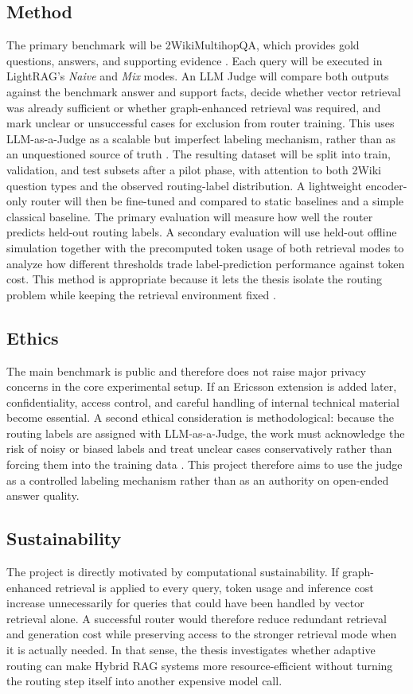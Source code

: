 \documentclass[11pt, a4paper]{article}
\begin{document}
\subsection{Method} The primary benchmark will be 2WikiMultihopQA, which provides gold questions, answers, and supporting evidence \cite{ho2020twowiki}. Each query will be executed in LightRAG's \emph{Naive} and \emph{Mix} modes. An LLM Judge will compare both outputs against the benchmark answer and support facts, decide whether vector retrieval was already sufficient or whether graph-enhanced retrieval was required, and mark unclear or unsuccessful cases for exclusion from router training. This uses LLM-as-a-Judge as a scalable but imperfect labeling mechanism, rather than as an unquestioned source of truth \cite{zheng2023judge}. The resulting dataset will be split into train, validation, and test subsets after a pilot phase, with attention to both 2Wiki question types and the observed routing-label distribution. A lightweight encoder-only router will then be fine-tuned and compared to static baselines and a simple classical baseline. The primary evaluation will measure how well the router predicts held-out routing labels. A secondary evaluation will use held-out offline simulation together with the precomputed token usage of both retrieval modes to analyze how different thresholds trade label-prediction performance against token cost. This method is appropriate because it lets the thesis isolate the routing problem while keeping the retrieval environment fixed \cite{hu2024routerbench,jeong2024adaptiverag,benayas2024encoder}.

\subsection{Ethics} The main benchmark is public and therefore does not raise major privacy concerns in the core experimental setup. If an Ericsson extension is added later, confidentiality, access control, and careful handling of internal technical material become essential. A second ethical consideration is methodological: because the routing labels are assigned with LLM-as-a-Judge, the work must acknowledge the risk of noisy or biased labels and treat unclear cases conservatively rather than forcing them into the training data \cite{zheng2023judge}. This project therefore aims to use the judge as a controlled labeling mechanism rather than as an authority on open-ended answer quality.

\subsection{Sustainability} The project is directly motivated by computational sustainability. If graph-enhanced retrieval is applied to every query, token usage and inference cost increase unnecessarily for queries that could have been handled by vector retrieval alone. A successful router would therefore reduce redundant retrieval and generation cost while preserving access to the stronger retrieval mode when it is actually needed. In that sense, the thesis investigates whether adaptive routing can make Hybrid RAG systems more resource-efficient without turning the routing step itself into another expensive model call.
\end{document}
